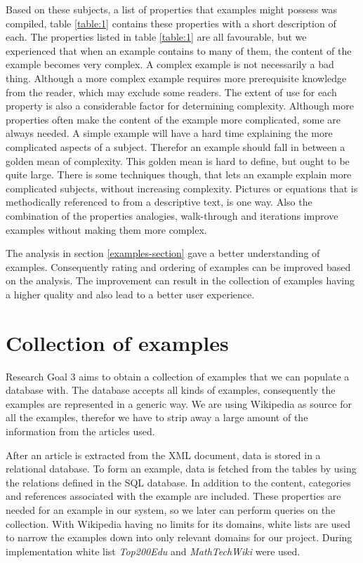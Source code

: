 Based on these subjects, a list of properties that examples might possess was compiled, table \ref{table:1} contains these properties with a short description of each. The properties listed in table \ref{table:1} are all favourable, but we experienced that when an example contains to many of them, the content of the example becomes very complex. A complex example is not necessarily a bad thing. Although a more complex example requires more prerequisite knowledge from the reader, which may exclude some readers. The extent of use for each property is also a considerable factor for determining complexity. Although more properties often make the content of the example more complicated, some are always needed. A simple example will have a hard time explaining the more complicated aspects of a subject. Therefor an example should fall in between a golden mean of complexity. This golden mean is hard to define, but ought to be quite large. There is some techniques though, that lets an example explain more complicated subjects, without increasing complexity. Pictures or equations that is methodically referenced to from a descriptive text, is one way. Also the combination of the properties analogies, walk-through and iterations improve examples without making them more complex. 

The analysis in section \ref{examples-section} gave a better understanding of examples. Consequently rating and ordering of examples can be improved based on the analysis. 
The improvement can result in the collection of examples having a higher quality and also lead to a better user experience. 


\section{Collection of examples} \label{5:exampleCollection}
Research Goal 3 aims to obtain a collection of examples that we can populate a database with. The database accepts all kinds of examples, consequently the examples are represented in a generic way. We are using Wikipedia as source for all the examples, therefor we have to strip away a large amount of the information from the articles used. 

After an article is extracted from the XML document, data is stored in a relational database. To form an example, data is fetched from the tables by using the relations defined in the SQL database. In addition to the content, categories and references associated with the example are included. These properties are needed for an example in our system, so we later can perform queries on the collection. With Wikipedia having no limits for its domains, white lists are used to narrow the examples down into only relevant domains for our project. During implementation white list \textit{Top200Edu} and \textit{MathTechWiki} were used.

